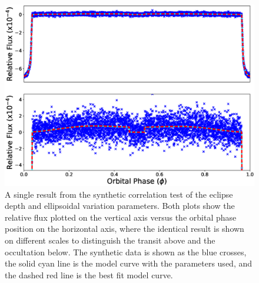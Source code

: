 \documentclass[manuscript]{aastex}
\begin{document}
\begin{figure}

\includegraphics[width=1.0\textwidth]{synthetic_fits_ellipsoidal_vary.eps}
\caption{A single result from the synthetic correlation test of the eclipse depth and ellipsoidal variation parameters. Both plots show the relative flux plotted on the vertical axis versus the orbital phase position on the horizontal axis, where the identical result is shown on different scales to distinguish the transit above and the occultation below. The synthetic data is shown as the blue crosses, the solid cyan line is the model curve with the parameters used, and the dashed red line is the best fit model curve.}

\end{figure}
\end{document}
